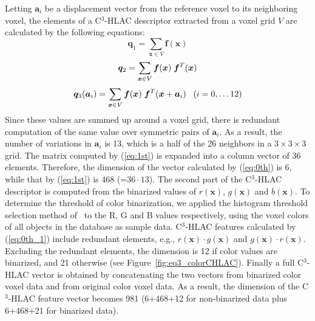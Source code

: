 \documentclass[a4paper, 10 pt, conference]{sty/ieeeconf}
\begin{document}
%
Letting ${\bm a_i}$ be a displacement vector from the reference voxel to its neighboring voxel, 
the elements of a C$^3$-HLAC descriptor extracted from a voxel grid $V$ are calculated by the following equations:
\begin{equation}\label{eq:0th}
  {\bm q_1} = \sum_{{\bm x} \in V} \bm{f}({\bm x})
\end{equation}
\begin{equation}\label{eq:0th_1}
  {\bm q_2} = \sum_{{\bm x} \in V} \bm{f}({\bm x}) \hspace{1mm}\bm{f}^T({\bm x}) \\
\end{equation}
\begin{equation}\label{eq:1st}
  {\bm q_3}({\bm a}_i) = \sum_{{\bm x} \in V} \bm{f}({\bm x}) \hspace{1mm}\bm{f}^T({\bm x}+{\bm a_i}) \;\;\; (i=0, \dots 12) \\
\end{equation}
%
Since these values are summed up around a voxel grid, there is redundant computation of the 
same value over symmetric pairs of ${\bm a_i}$. 
As a result, the number of variations in ${\bm a_i}$ is 13, which is a half of the 26 neighbors in a $3\times3\times3$ grid.
The matrix computed by (\ref{eq:1st}) is expanded into a column vector of 36 elements.
Therefore, the dimension of the vector calculated by (\ref{eq:0th}) is 6, while that by 
(\ref{eq:1st}) is 468 (=$36\cdot13$).
The second part of the C$^3$-HLAC descriptor is computed from the binarized values of $r(\bm{x})$, $g(\bm{x})$ 
and $b(\bm{x})$. 
To determine the threshold of color binarization, 
    we applied the histogram threshold selection method of~\cite{otsu1979} to the R, G and B values respectively, 
    using the voxel colors of all objects in the database as sample data.
C$^3$-HLAC features calculated by (\ref{eq:0th_1}) include redundant elements, e.g., $r(\bm{x})\cdot g(\bm{x})$ and $g(\bm{x})\cdot r(\bm{x})$.
Excluding the redundant elements, the dimension is 12 if color values are binarized, and 21 otherwise (see Figure~\ref{fig:eq3_colorCHLAC}). 
Finally a full C$^3$-HLAC vector is obtained by concatenating the two vectors from binarized 
color voxel data and from original color voxel data. As a result, the dimension of the C$^3$-HLAC feature vector 
becomes 981 (6+468+12 for non-binarized data plus 6+468+21 for binarized data). 
\end{document}
